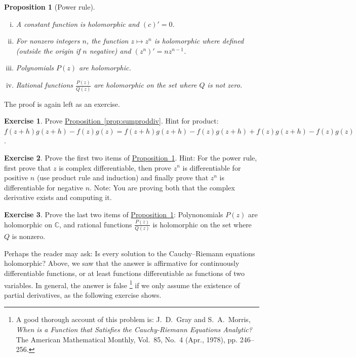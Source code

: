 \documentclass[12pt,openany]{book}
\newcommand{\C}{{\mathbb{C}}}
\theoremstyle{plain}
\newtheorem{prop}[thm]{Proposition}
\theoremstyle{remark}
\theoremstyle{definition}
\newenvironment{exbox}{%
    \def\FrameCommand{\vrule width 1pt \relax\hspace {10pt}}%
    \MakeFramed {\advance \hsize -\width \FrameRestore }%
}{%
    \endMakeFramed
}
\theoremstyle{exercise}
\newtheorem{exercise}{Exercise}[section]
\theoremstyle{example}
\newcommand{\propref}[1]{\hyperref[#1]{Proposition~\ref*{#1}}}
\begin{document}
\begin{prop}[Power rule] \label{prop:powerrule}
\leavevmode
\begin{enumerate}[(i)]
\item A constant function is holomorphic and $(c)' = 0$.
\item For nonzero integers $n$, the function $z \mapsto z^n$ is holomorphic
where defined (outside the origin if $n$ negative) and $(z^n)' = n z^{n-1}$.
\item Polynomials $P(z)$ are holomorphic.
\item Rational functions $\frac{P(z)}{Q(z)}$
are holomorphic on the set where $Q$ is not zero.
\end{enumerate}
\end{prop}

The proof is again left as an exercise.

\begin{exbox}
\begin{exercise}
Prove \propref{prop:sumproddiv}.
Hint for product: 
$f(z+h)g(z+h) - f(z)g(z) =
f(z+h)g(z+h) - f(z)g(z+h) +
f(z)g(z+h) - f(z)g(z)$.
\end{exercise}

\begin{exercise}
Prove the first two items of \propref{prop:powerrule}.
Hint: For the power rule, first prove that $z$ is complex differentiable,
then prove $z^n$ is differentiable for positive $n$ (use product rule and
induction) and finally prove
that $z^n$ is differentiable for negative $n$.
Note: You are proving both that the complex derivative exists and
computing it.
\end{exercise}

\begin{exercise}
Prove the last two items of \propref{prop:powerrule}:
Polynonomials $P(z)$ are holomorphic on $\C$,
and rational functions
$\frac{P(z)}{Q(z)}$ is holomorphic on the set where $Q$ is nonzero.
\end{exercise}
\end{exbox}

Perhaps the reader may ask:
Is every solution to
the Cauchy--Riemann equations holomorphic?  Above, we saw that the answer
is affirmative for continuously differentiable functions, or at least
functions differentiable as functions of two variables.
In general, the answer is false%
\footnote{%
A good thorough account of this problem is:
J.\ D.\ Gray and  S.\ A.\ Morris,
\emph{When is a Function that Satisfies the Cauchy-Riemann Equations
Analytic?}  The American Mathematical Monthly, Vol.\ 85, No.\ 4 (Apr.,
1978), pp. 246--256.} if we only assume the existence of partial derivatives,
as the following exercise shows.
\end{document}
